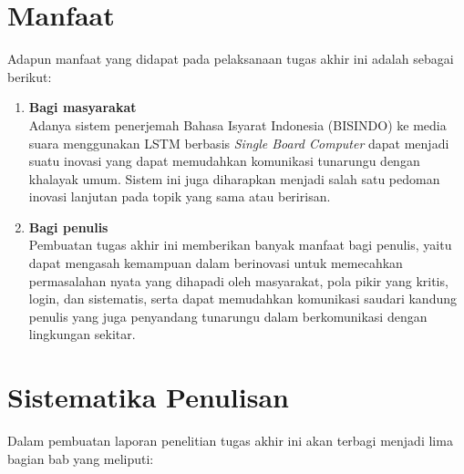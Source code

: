 \section{Manfaat}
\label{sec:manfaatpenulisan}

Adapun manfaat yang didapat pada pelaksanaan tugas akhir ini adalah sebagai berikut:

\begin{enumerate}[nolistsep]

  \item \textbf{Bagi masyarakat} \\     
  Adanya sistem penerjemah Bahasa Isyarat Indonesia (BISINDO) ke media suara menggunakan LSTM berbasis \emph{Single Board Computer} dapat menjadi suatu inovasi yang dapat memudahkan komunikasi tunarungu dengan khalayak umum. Sistem ini juga diharapkan menjadi salah satu pedoman inovasi lanjutan pada topik yang sama atau beririsan.
        \vspace{2ex}

  \item \textbf{Bagi penulis} \\
  Pembuatan tugas akhir ini memberikan banyak manfaat bagi penulis, yaitu dapat mengasah kemampuan dalam berinovasi untuk memecahkan permasalahan nyata yang dihapadi oleh masyarakat, pola pikir yang kritis, login, dan sistematis, serta dapat memudahkan komunikasi saudari kandung penulis yang juga penyandang tunarungu dalam berkomunikasi dengan lingkungan sekitar.

\end{enumerate}

\section{Sistematika Penulisan}
\label{sec:sistematikapenulisan
}

Dalam pembuatan laporan penelitian tugas akhir ini akan terbagi menjadi lima bagian bab yang meliputi:


